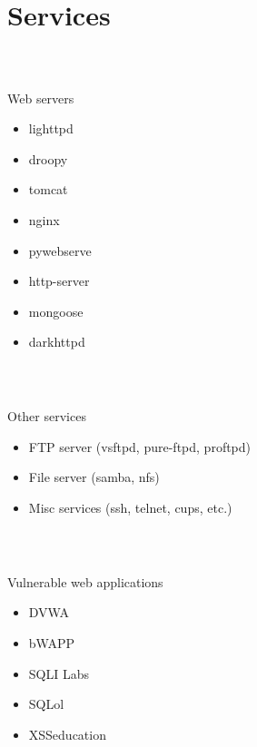 \section{Services}
%
\begin{frame}
\frametitle{\\}
%
{\LARGE Web servers \newline}
\begin{itemize}
  \item lighttpd
  \item droopy
  \item tomcat
  \item nginx
  \item pywebserve
  \item http-server
  \item mongoose
  \item darkhttpd
\end{itemize}
\end{frame}
%
\begin{frame}
\frametitle{\\}
%
{\LARGE Other services \newline}
\begin{itemize}
  \item FTP server (vsftpd, pure-ftpd, proftpd)
  \item File server (samba, nfs)
  \item Misc services (ssh, telnet, cups, etc.)
\end{itemize}
\end{frame}
%
\begin{frame}
\frametitle{\\}
\vspace{2pt}
%
{\LARGE Vulnerable web applications \newline}
\begin{itemize}
  \item DVWA
  \item bWAPP
  \item SQLI Labs
  \item SQLol
  \item XSSeducation
\end{itemize}
\end{frame}
%
